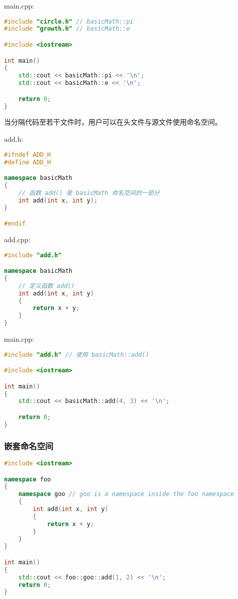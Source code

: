 \documentclass[../../LearnCpp.tex]{subfiles}
\begin{document}
main.cpp:

\begin{lstlisting}[language=C++]
#include "circle.h" // basicMath::pi
#include "growth.h" // basicMath::e

#include <iostream>

int main()
{
    std::cout << basicMath::pi << '\n';
    std::cout << basicMath::e << '\n';

    return 0;
}
\end{lstlisting}

当分隔代码至若干文件时，用户可以在头文件与源文件使用命名空间。

add.h:

\begin{lstlisting}[language=C++]
#ifndef ADD_H
#define ADD_H

namespace basicMath
{
    // 函数 add() 是 basicMath 命名空间的一部分
    int add(int x, int y);
}

#endif
\end{lstlisting}

add.cpp:

\begin{lstlisting}[language=C++]
#include "add.h"

namespace basicMath
{
    // 定义函数 add()
    int add(int x, int y)
    {
        return x + y;
    }
}
\end{lstlisting}

main.cpp:

\begin{lstlisting}[language=C++]
#include "add.h" // 使用 basicMath::add()

#include <iostream>

int main()
{
    std::cout << basicMath::add(4, 3) << '\n';

    return 0;
}
\end{lstlisting}

\subsubsection*{嵌套命名空间}

\begin{lstlisting}[language=C++]
#include <iostream>

namespace foo
{
    namespace goo // goo is a namespace inside the foo namespace
    {
        int add(int x, int y)
        {
            return x + y;
        }
    }
}

int main()
{
    std::cout << foo::goo::add(1, 2) << '\n';
    return 0;
}
\end{lstlisting}
\end{document}
